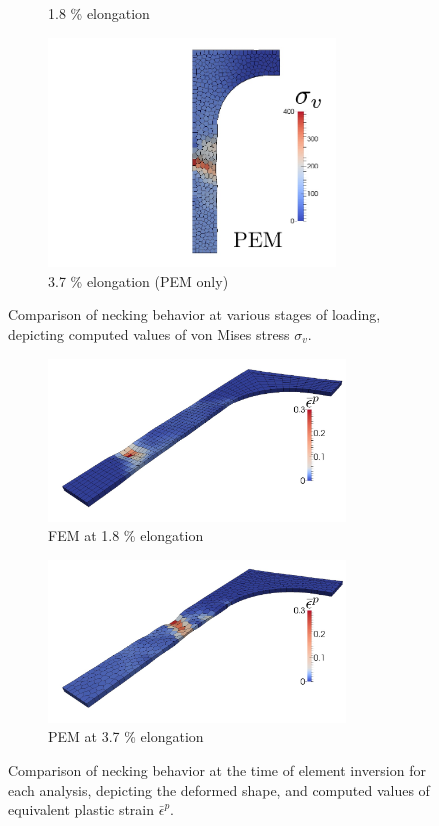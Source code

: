 \begin{figure}[!h]
\begin{subfigure}[b]{0.49\linewidth}
    			\caption{1.8 \% elongation \label{fig:necking_t2}}
    \end{subfigure}
	\begin{subfigure}[b]{0.49\linewidth}
            \centering
            \includegraphics[width=3.0in]{figures/necking_t3.pdf}
    			\caption{3.7 \% elongation (PEM only) \label{fig:necking_t3}}
    \end{subfigure}
    \caption{Comparison of necking behavior at various stages of loading, depicting computed values of von Mises stress $\sigma_v$.}
    \label{fig:necking_vm}
\end{figure}

\begin{figure}[!h]
  \centering
    \begin{subfigure}[b]{0.49\linewidth}
            \centering
            \includegraphics[width=3.1in]{figures/necking_deformed_iso.pdf}
    			\caption{FEM at 1.8 \% elongation \label{fig:necking_deformed_iso}}
    \end{subfigure}
	\begin{subfigure}[b]{0.49\linewidth}
            \centering
            \includegraphics[width=3.1in]{figures/necking_deformed_pem.pdf}
    			\caption{PEM at 3.7 \% elongation \label{fig:necking_deformed_pem}}
    \end{subfigure} \caption{Comparison of necking behavior at the time of element inversion for each analysis, depicting the deformed shape, and computed values of equivalent plastic strain $\bar{\epsilon}^p$.}
  \label{fig:necking_meshes}
\end{figure}


